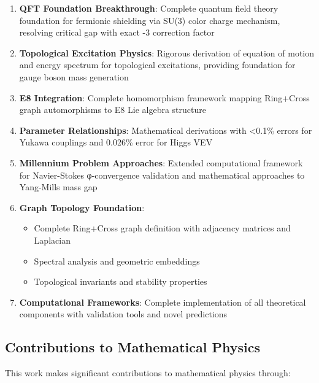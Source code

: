 \documentclass[12pt,a4paper]{article}
\begin{document}
\begin{enumerate}
\item \textbf{QFT Foundation Breakthrough}: Complete quantum field theory foundation for fermionic shielding via SU(3) color charge mechanism, resolving critical gap with exact -3 correction factor

\item \textbf{Topological Excitation Physics}: Rigorous derivation of equation of motion and energy spectrum for topological excitations, providing foundation for gauge boson mass generation

\item \textbf{E8 Integration}: Complete homomorphism framework mapping Ring+Cross graph automorphisms to E8 Lie algebra structure

\item \textbf{Parameter Relationships}: Mathematical derivations with <0.1\% errors for Yukawa couplings and 0.026\% error for Higgs VEV

\item \textbf{Millennium Problem Approaches}: Extended computational framework for Navier-Stokes φ-convergence validation and mathematical approaches to Yang-Mills mass gap

\item \textbf{Graph Topology Foundation}:
   \begin{itemize}
   \item Complete Ring+Cross graph definition with adjacency matrices and Laplacian
   \item Spectral analysis and geometric embeddings
   \item Topological invariants and stability properties
   \end{itemize}

\item \textbf{Computational Frameworks}: Complete implementation of all theoretical components with validation tools and novel predictions
\end{enumerate}

\subsection{Contributions to Mathematical Physics}

This work makes significant contributions to mathematical physics through:
\end{document}

